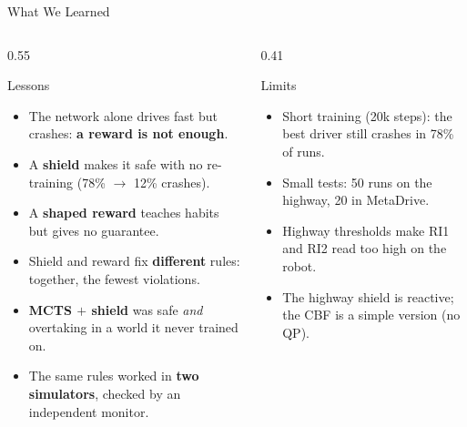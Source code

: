 \documentclass[aspectratio=169,10pt,xcolor=table]{beamer}
\begin{document}
\begin{frame}{What We Learned}
  \begin{columns}[T]
    \begin{column}{0.55\textwidth}
      \begin{block}{Lessons}
        \footnotesize
        \begin{itemize}
          \item The network alone drives fast but crashes: \textbf{a reward is not enough}.
          \item A \textbf{shield} makes it safe with no re-training (78\% $\to$ 12\% crashes).
          \item A \textbf{shaped reward} teaches habits but gives no guarantee.
          \item Shield and reward fix \textbf{different} rules: together, the fewest violations.
          \item \textbf{MCTS $+$ shield} was safe \emph{and} overtaking in a world it never trained on.
          \item The same rules worked in \textbf{two simulators}, checked by an independent monitor.
        \end{itemize}
      \end{block}
    \end{column}
    \begin{column}{0.41\textwidth}
      \begin{block}{Limits}
        \footnotesize
        \begin{itemize}
          \item Short training (20k steps): the best driver still crashes in 78\% of runs.
          \item Small tests: 50 runs on the highway, 20 in MetaDrive.
          \item Highway thresholds make RI1 and RI2 read too high on the robot.
          \item The highway shield is reactive; the CBF is a simple version (no QP).
        \end{itemize}
      \end{block}
    \end{column}
  \end{columns}
\end{frame}
\end{document}

